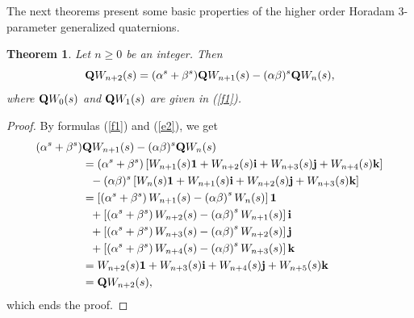 \documentclass{kms-c}
\theoremstyle{plain}
\newtheorem{theorem}{Theorem}[section]
\theoremstyle{definition}
\theoremstyle{remark}
\begin{document}
The next theorems present some basic properties of the higher order Horadam 3-parameter generalized quaternions.
\begin{theorem}\label{t1}
Let $n\geq 0$ be an integer. Then
\[
\textnormal{\textbf{Q}}W_{n+2}(s)=(\alpha^{s}+\beta^{s})\textnormal{\textbf{Q}}W_{n+1}(s)-(\alpha\beta)^{s}\textnormal{\textbf{Q}}W_{n}(s),
\]
where $\textnormal{\textbf{Q}}W_{0}(s)$ and $\textnormal{\textbf{Q}}W_{1}(s)$ are given in (\ref{f1}).
\end{theorem}
\begin{proof}
By formulas (\ref{f1}) and (\ref{e2}), we get
\begin{align*}
(\alpha^{s}+\beta^{s})&\textnormal{\textbf{Q}}W_{n+1}(s)-(\alpha\beta)^{s}\textnormal{\textbf{Q}}W_{n}(s)\\
&=(\alpha^{s}+\beta^{s})\left[W_{n+1}(s)\textbf{1}+W_{n+2}(s)\textbf{i}+W_{n+3}(s)\textbf{j}+W_{n+4}(s)\textbf{k}\right]\\
&\ \ - (\alpha\beta)^{s}\left[W_{n}(s)\textbf{1}+W_{n+1}(s)\textbf{i}+W_{n+2}(s)\textbf{j}+W_{n+3}(s)\textbf{k}\right]\\
&=\left[\left(\alpha^{s}+\beta^{s}\right)W_{n+1}(s)-\left(\alpha\beta\right)^{s}W_{n}(s)\right]\textbf{1}\\
&\ \ + \left[\left(\alpha^{s}+\beta^{s}\right)W_{n+2}(s)-\left(\alpha\beta\right)^{s}W_{n+1}(s)\right]\textbf{i}\\
&\ \ + \left[\left(\alpha^{s}+\beta^{s}\right)W_{n+3}(s)-\left(\alpha\beta\right)^{s}W_{n+2}(s)\right]\textbf{j}\\
&\ \ + \left[\left(\alpha^{s}+\beta^{s}\right)W_{n+4}(s)-\left(\alpha\beta\right)^{s}W_{n+3}(s)\right]\textbf{k}\\
&=W_{n+2}(s)\textbf{1}+W_{n+3}(s)\textbf{i}+W_{n+4}(s)\textbf{j}+W_{n+5}(s)\textbf{k}\\
&=\textnormal{\textbf{Q}}W_{n+2}(s),
\end{align*}
which ends the proof.
\end{proof}
\end{document}
